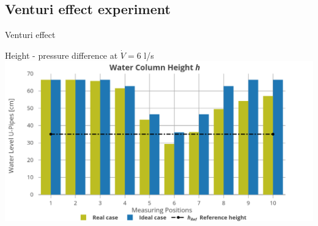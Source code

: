 \documentclass{article}
\begin{document}
\newpage
\begin{multicols}{2}
\setlength{\columnsep}{1pt}

\subsection{Venturi effect experiment}
\begin{examplebox}{Venturi effect}
    \begin{theorybox}{Height - pressure difference at $\dot{V} = 6$ l/s}
        \includegraphics[width=\textwidth]{media/venturi.png}
    \end{theorybox}



\end{examplebox}
\end{multicols}
\end{document}
